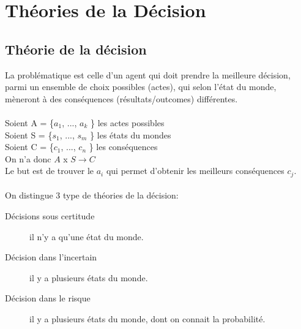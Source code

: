 \part{Théories de la Décision}
\pagebreak

\chapter{Théorie de la décision}

La problématique est celle d'un agent qui doit prendre la meilleure décision, parmi un ensemble de choix possibles (actes), qui selon l'état du monde, mèneront à des conséquences (résultats/outcomes) différentes.\\
\\
Soient A = \{$a_1$, $...$, $a_k$ \} les actes possibles\\
Soient S = \{$s_1$, $...$, $s_m$ \} les états du mondes\\
Soient C = \{$c_1$, $...$, $c_n$ \} les conséquences\\
On n'a donc $A $ x $ S \rightarrow C$\\
Le but est de trouver le $a_i$ qui permet d'obtenir les meilleurs conséquences $c_j$.\\
\\
On distingue 3 type de théories de la décision:
\begin{description}
\item[Décisions sous certitude] il n'y a qu'une état du monde.
\item[Décision dans l'incertain] il y a plusieurs états du monde.
\item[Décision dans le risque] il y a plusieurs états du monde, dont on connait la probabilité.
\end{description}

\pagebreak

